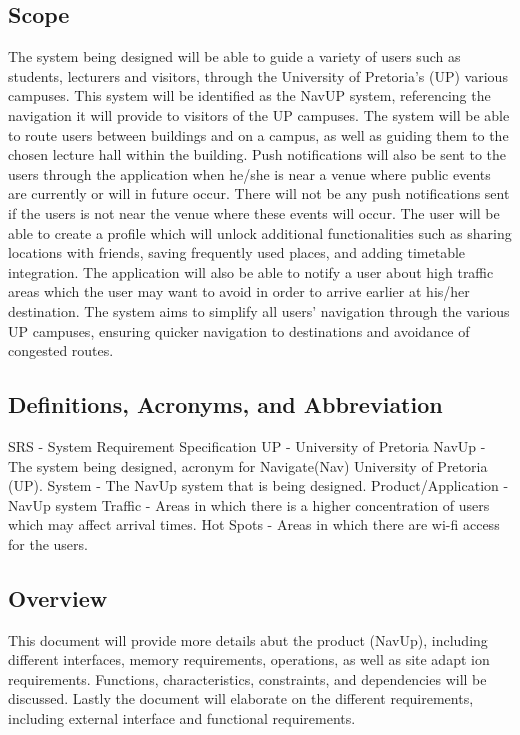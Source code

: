 \documentclass[12pt, a4paper]{article}
\begin{document}
\subsection{Scope}
The system being designed will be able to guide a variety of users such as students, lecturers and visitors, through the University of Pretoria's (UP) various campuses. This system will be identified as the NavUP system, referencing the navigation it will provide to visitors of the UP campuses. The system will be able to route users between buildings and on a campus, as well as guiding them to the chosen lecture hall within the building. Push notifications will also be sent to the users through the application when he/she is near a venue where public events are currently or will in future occur. There will not be any push notifications sent if the users is not near the venue where these events will occur. The user will be able to create a profile which will unlock additional functionalities such as sharing locations with friends, saving frequently used places, and adding timetable integration. The application will also be able to notify a user about high traffic areas which the user may want to avoid in order to arrive earlier at his/her destination. The system aims to simplify all users' navigation through the various UP campuses, ensuring quicker navigation to destinations and avoidance of congested routes.     
\subsection{Definitions, Acronyms, and Abbreviation}
SRS - System Requirement Specification
UP - University of Pretoria
NavUp - The system being designed, acronym for Navigate(Nav) University of Pretoria (UP).
System - The NavUp system that is being designed.
Product/Application - NavUp system
Traffic - Areas in which there is a higher concentration of users which may affect arrival times.
Hot Spots - Areas in which there are wi-fi access for the users.
\subsection{Overview}
This document will provide more details abut the product (NavUp), including different interfaces, memory requirements, operations, as well as site adapt ion requirements. Functions, characteristics, constraints, and dependencies will be discussed. Lastly the document will elaborate on  the different requirements, including external interface and functional requirements.
\end{document}
